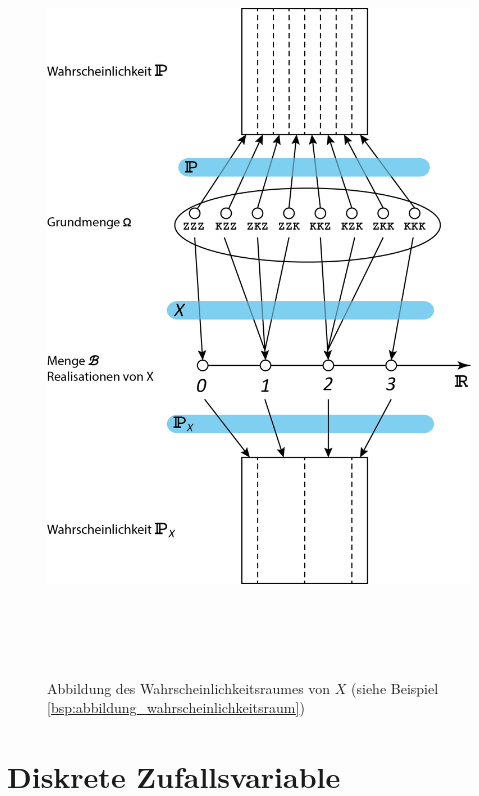 {    \begin{figure}
    \centering
        \includegraphics[width=5.8102in,height=7.8744in]{chapters/zufallsvariable/wahrscheinlichkeitsraum}
        \caption{Abbildung des Wahrscheinlichkeitsraumes von $X$ (siehe Beispiel \ref{bsp:abbildung_wahrscheinlichkeitsraum})}
        \label{fig:abbildung_wahrscheinlichkeitsraum}
    \end{figure}

    \section{Diskrete Zufallsvariable}

}
